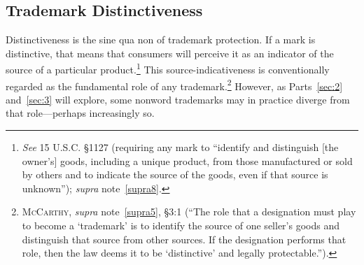 \documentclass[letterpaper, 11pt, oneside]{article}
\begin{document}
\subsection{Trademark Distinctiveness} \label{subsec:1B}

Distinctiveness is the sine qua non of trademark protection. If a mark is distinctive, that means that consumers will perceive it as an indicator of the source of a particular product.\footnote{\textit{See} 15 U.S.C. \S 1127 (requiring any mark to ``identify and distinguish [the owner's] goods, including a unique product, from those manufactured or sold by others and to indicate the source of the goods, even if that source is unknown''); \textit{supra} note~\ref{supra8}.} This source-indicativeness is conventionally regarded as the fundamental role of any trademark.\footnote{\textsc{McCarthy}, \textit{supra} note~\ref{supra5}, \S 3:1 (``The role that a designation must play to become a `trademark' is to identify the source of one seller's goods and distinguish that source from other sources. If the designation performs that role, then the law deems it to be `distinctive' and legally protectable.'').} However, as Parts~\ref{sec:2} and~\ref{sec:3} will explore, some nonword trademarks may in practice diverge from that role—perhaps increasingly so.
\end{document}
